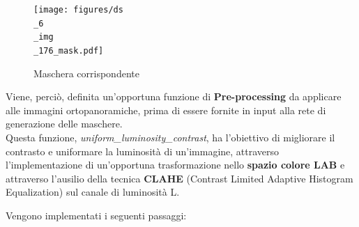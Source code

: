 \documentclass[12pt,a4paper,openright,twoside]{book}
\begin{document}
\begin{figure}[H]
	\centering
	\texttt{[image: figures/ds\\\_6\\\_img\\\_176\_mask.pdf]}
    	\caption{Maschera corrispondente}
	\label{fig:maskLuminosa}
\end{figure}
Viene, perciò, definita un'opportuna funzione di \textbf{Pre-processing} da applicare alle immagini ortopanoramiche, prima di essere fornite in input alla rete di generazione delle maschere.\\
Questa funzione, {\itshape uniform\_luminosity\_contrast}, ha l'obiettivo di migliorare il contrasto e uniformare la luminosità di un'immagine, attraverso l'implementazione di un'opportuna trasformazione nello \textbf{spazio colore LAB} e attraverso l'ausilio della tecnica \textbf{CLAHE} (Contrast Limited Adaptive Histogram Equalization) sul canale di luminosità L.
\begin{figure}[H]
    \centering
    
\end{figure}
Vengono implementati i seguenti passaggi:
\end{document}
